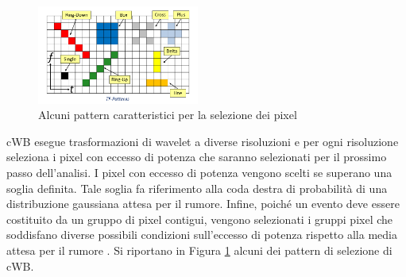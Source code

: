 \begin{figure}
	\vspace{-15pt}
	\begin{center}
		\includegraphics[width=0.475\textwidth]{figures/Capitolo_2/wavepacket_patterns.png}
	\end{center}
	\vspace{-5pt}
	\caption{Alcuni pattern caratteristici per la selezione dei pixel}
	\label{fig:patterns}
	\vspace{-15pt}
\end{figure}
cWB esegue trasformazioni di wavelet a diverse risoluzioni e per ogni risoluzione seleziona i pixel con eccesso di potenza che saranno selezionati per il prossimo passo dell'analisi. I pixel con eccesso di potenza vengono scelti se superano una soglia definita. Tale soglia fa riferimento alla coda destra di probabilità di una distribuzione gaussiana attesa per il rumore. Infine, poiché un evento deve essere costituito da un gruppo di pixel contigui, vengono selezionati i gruppi pixel che soddisfano diverse possibili condizioni sull'eccesso di potenza rispetto alla media attesa per il rumore \cite{cWB_Manual}. Si riportano in Figura \ref{fig:patterns} alcuni dei pattern di selezione di cWB.
%
